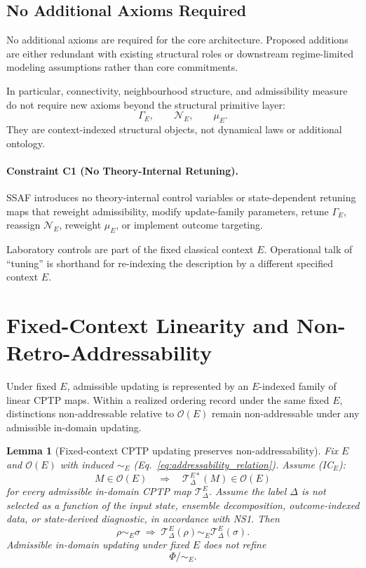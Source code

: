 \documentclass[aps,prx,onecolumn,11pt]{revtex4-2}
\theoremstyle{plain}
\newtheorem{lemma}{Lemma}
\theoremstyle{definition}
\theoremstyle{remark}
\begin{document}
\subsection{No Additional Axioms Required}
\label{subsec:no_additional_axioms}

No additional axioms are required for the core architecture. Proposed
additions are either redundant with existing structural roles or
downstream regime-limited modeling assumptions rather than core
commitments.

In particular, connectivity, neighbourhood structure, and admissibility
measure do not require new axioms beyond the structural primitive layer:
\[
\Gamma_E,
\qquad
\mathcal N_E,
\qquad
\mu_E.
\]
They are context-indexed structural objects, not dynamical laws or
additional ontology.

\paragraph*{Constraint C1 (No Theory-Internal Retuning).}
\label{par:constraint_c1}

SSAF introduces no theory-internal control variables or state-dependent
retuning maps that reweight admissibility, modify update-family
parameters, retune \(\Gamma_E\), reassign \(\mathcal N_E\), reweight
\(\mu_E\), or implement outcome targeting.

Laboratory controls are part of the fixed classical context \(E\).
Operational talk of ``tuning'' is shorthand for re-indexing the
description by a different specified context \(E\).

\section{Fixed-Context Linearity and Non-Retro-Addressability}
\label{sec:NS1_immediate_consequence}

Under fixed \(E\), admissible updating is represented by an
\(E\)-indexed family of linear CPTP maps. Within a realized ordering
record under the same fixed \(E\), distinctions non-addressable relative
to \(\mathcal{O}(E)\) remain non-addressable under any admissible
in-domain updating.

\begin{lemma}[Fixed-context CPTP updating preserves non-addressability]
\label{lem:NS1_CPTP_no_retro}
Fix \(E\) and \(\mathcal{O}(E)\) with induced \(\sim_E\)
(Eq.~\eqref{eq:addressability_relation}). Assume \emph{(IC\(_E\))}:
\[
M\in\mathcal{O}(E)
\quad\Longrightarrow\quad
\mathcal{T}^{E*}_\Delta(M)\in\mathcal{O}(E)
\]
for every admissible in-domain CPTP map \(\mathcal{T}^E_\Delta\).
Assume the label \(\Delta\) is not selected as a function of the input
state, ensemble decomposition, outcome-indexed data, or state-derived
diagnostic, in accordance with NS1. Then
\[
\rho\sim_E\sigma
\;\Longrightarrow\;
\mathcal{T}^E_\Delta(\rho)\sim_E\mathcal{T}^E_\Delta(\sigma).
\]
Admissible in-domain updating under fixed \(E\) does not refine
\[
\Phi/{\sim_E}.
\]
\end{lemma}
\end{document}
